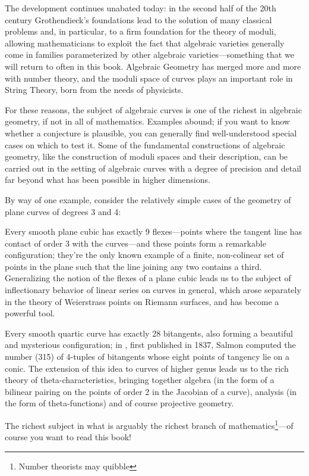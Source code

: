 The development continues unabated today: in the second half of the 20th century Grothendieck's foundations lead to the solution of many classical problems and, in particular, to a firm foundation for the theory of moduli, allowing mathematicians to exploit the fact that algebraic varieties generally come in families parameterized by other algebraic varieties---something that we will return to often in this book. Algebraic Geometry has merged more and more with number theory, and the moduli space of curves plays an important role in String Theory, born from the needs of physicists.

For these reasons, the subject of algebraic curves is one of the richest in algebraic geometry, if not in all of mathematics. Examples abound; if you want to know whether a conjecture is plausible, you can generally find well-understood special cases on which to test it. Some of the fundamental constructions of algebraic geometry, like the construction of moduli spaces and their description, can be carried out in the setting of algebraic curves with a degree of precision and detail far beyond what has been possible in higher dimensions. 

By way of one example, consider the relatively simple cases of the geometry of plane curves of degrees 3 and 4: 

Every smooth plane cubic has exactly 9 flexes---points where the tangent line has contact of order 3 with the curves---and these points form a remarkable configuration; they're the only known example of a finite, non-colinear set of points in the plane such that the line joining any two contains a third. Generalizing the notion of the flexes of a plane cubic leads us to the subject of inflectionary behavior of linear series on curves in general, which arose separately in the theory of Weierstrass points on Riemann surfaces, and  has become a powerful tool. 

Every smooth quartic curve has exactly 28 bitangents, also forming a beautiful and mysterious configuration;  in \cite{MR0115124}, first published in 1837, Salmon computed the number (315) of 4-tuples of bitangents whose eight points of tangency lie on a conic. The extension of this idea to curves of higher genus leads us to the rich theory of theta-characteristics, bringing together algebra (in the form of a bilinear pairing on the points of order 2 in the Jacobian of a curve), analysis (in the form of theta-functions) and of course projective geometry.

The richest subject in what is arguably the richest branch of mathematics\footnote{Number theorists may quibble}---of course you want to read this book! 

